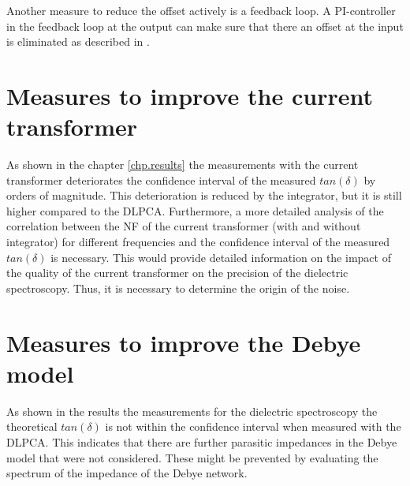 Another measure to reduce the offset actively is a feedback loop. A PI-controller in the feedback loop at the output can make sure that there an offset at the input is eliminated as described in \cite{thomas}. 

\section{Measures to improve the current transformer}
As shown in the chapter \ref{chp.results} the measurements with the current transformer deteriorates the confidence interval of the measured $tan(\delta)$ by orders of magnitude. This deterioration is reduced by the integrator, but it is still higher compared to the DLPCA. 
Furthermore, a more detailed analysis of the correlation between the NF of the current transformer (with and without integrator) for different frequencies and the confidence interval of the measured $tan(\delta)$ is necessary. This would provide detailed information on the impact of the quality of the current transformer on the precision of the dielectric spectroscopy. Thus, it is necessary to determine the origin of the noise. 


\section{Measures to improve the Debye model}
\label{debyemodel}
As shown in the results the measurements for the dielectric spectroscopy the theoretical $tan(\delta)$ is not within the confidence interval when measured with the DLPCA. This indicates that there are further parasitic impedances in the Debye model that were not considered. These might be prevented by evaluating the spectrum of the impedance of the Debye network. 


